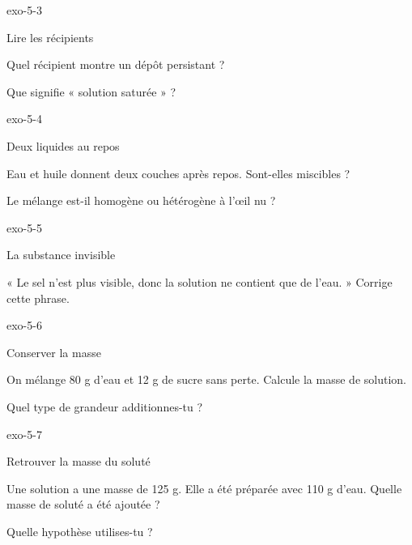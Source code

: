 \documentclass[12pt,twoside,openany]{book}
\begin{document}
\begin{blocLivre}{exo-5-3}
\begin{exercice}[1]{Lire les récipients}
\begin{questions}
\item Quel récipient montre un dépôt persistant ?
\item Que signifie « solution saturée » ?
\end{questions}
\end{exercice}\end{blocLivre}
\begin{blocLivre}{exo-5-4}
\begin{exercice}[1]{Deux liquides au repos}
\begin{questions}
\item Eau et huile donnent deux couches après repos. Sont-elles miscibles ?
\item Le mélange est-il homogène ou hétérogène à l’œil nu ?
\end{questions}
\end{exercice}\end{blocLivre}
\begin{blocLivre}{exo-5-5}
\begin{exercice}[1]{La substance invisible}
\begin{questions}
\item « Le sel n’est plus visible, donc la solution ne contient que de l’eau. » Corrige cette phrase.
\end{questions}
\end{exercice}\end{blocLivre}
\begin{blocLivre}{exo-5-6}
\begin{exercice}[2]{Conserver la masse}
\begin{questions}
\item On mélange 80 g d’eau et 12 g de sucre sans perte. Calcule la masse de solution.
\item Quel type de grandeur additionnes-tu ?
\end{questions}
\end{exercice}\end{blocLivre}
\begin{blocLivre}{exo-5-7}
\begin{exercice}[2]{Retrouver la masse du soluté}
\begin{questions}
\item Une solution a une masse de 125 g. Elle a été préparée avec 110 g d’eau. Quelle masse de soluté a été ajoutée ?
\item Quelle hypothèse utilises-tu ?
\end{questions}
\end{exercice}\end{blocLivre}
\end{document}
